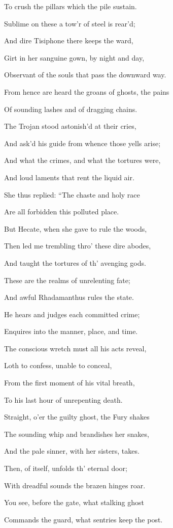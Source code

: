 To crush the pillars which the pile sustain.

Sublime on these a tow’r of steel is rear’d;

And dire Tisiphone there keeps the ward,

Girt in her sanguine gown, by night and day,

Observant of the souls that pass the downward way.

From hence are heard the groans of ghosts, the pains

Of sounding lashes and of dragging chains.

The Trojan stood astonish’d at their cries,

And ask’d his guide from whence those yells arise;

And what the crimes, and what the tortures were,

And loud laments that rent the liquid air.

She thus replied: “The chaste and holy race

Are all forbidden this polluted place.

But Hecate, when she gave to rule the woods,

Then led me trembling thro’ these dire abodes,

And taught the tortures of th’ avenging gods.

These are the realms of unrelenting fate;

And awful Rhadamanthus rules the state.

He hears and judges each committed crime;

Enquires into the manner, place, and time.

The conscious wretch must all his acts reveal,

Loth to confess, unable to conceal,

From the first moment of his vital breath,

To his last hour of unrepenting death.

Straight, o’er the guilty ghost, the Fury shakes

The sounding whip and brandishes her snakes,

And the pale sinner, with her sisters, takes.

Then, of itself, unfolds th’ eternal door;

With dreadful sounds the brazen hinges roar.

You see, before the gate, what stalking ghost

Commands the guard, what sentries keep the post.

